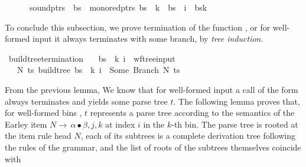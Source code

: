 \begin{isabellebody}
\ \ \ \ \ \ sound{\isacharunderscore}{\kern0pt}ptrs\ {\isasymomega}\ bs\ {\isasymand}\ mono{\isacharunderscore}{\kern0pt}red{\isacharunderscore}{\kern0pt}ptrs\ bs\ {\isasymand}\ k\ {\isacharless}{\kern0pt}\ {\isacharbar}{\kern0pt}bs{\isacharbar}{\kern0pt}\ {\isasymand}\ i\ {\isacharless}{\kern0pt}\ {\isacharbar}{\kern0pt}bs{\isacharbang}{\kern0pt}k{\isacharbar}{\kern0pt}\ {\isacharbraceright}{\kern0pt}{\isachardoublequoteclose}%
\begin{isamarkuptext}%
To conclude this subsection, we prove termination of the function , or for
well-formed input it always terminates with some branch, by \textit{tree induction}.%
\end{isamarkuptext}\isamarkuptrue%
\isamarkupfalse%
\ build{\isacharunderscore}{\kern0pt}tree{\isacharprime}{\kern0pt}{\isacharunderscore}{\kern0pt}termination{\isacharcolon}{\kern0pt}\isanewline
\ \ \ {\isachardoublequoteopen}{\isacharparenleft}{\kern0pt}bs{\isacharcomma}{\kern0pt}\ {\isasymomega}{\isacharcomma}{\kern0pt}\ k{\isacharcomma}{\kern0pt}\ i{\isacharparenright}{\kern0pt}\ {\isasymin}\ wf{\isacharunderscore}{\kern0pt}tree{\isacharunderscore}{\kern0pt}input{\isachardoublequoteclose}\isanewline
\ \ \ {\isachardoublequoteopen}{\isasymexists}N\ ts{\isachardot}{\kern0pt}\ build{\isacharunderscore}{\kern0pt}tree{\isacharprime}{\kern0pt}\ bs\ {\isasymomega}\ k\ i\ {\isacharequal}{\kern0pt}\ Some\ {\isacharparenleft}{\kern0pt}Branch\ N\ ts{\isacharparenright}{\kern0pt}{\isachardoublequoteclose}%
\isadelimproof
%
\endisadelimproof
%
\isatagproof
%
\endisatagproof
{\isafoldproof}%
%
\isadelimproof
%
\endisadelimproof
%
\isadelimdocument
%
\endisadelimdocument
%
\isatagdocument
%
\isamarkuptrue%
%
\endisatagdocument
{\isafolddocument}%
%
\isadelimdocument
%
\endisadelimdocument
%
\begin{isamarkuptext}%
From the previous lemma, We know that for well-formed input a call of the form  always terminates
and yields some parse tree $t$. The following lemma proves that, for well-formed bins ,
$t$ represents a parse tree according to the semantics of the Earley item $N \rightarrow \, \alpha \bullet \beta, j, k$
at index $i$ in the $k$-th bin. The parse tree is rooted at the item rule head $N$, each of its subtrees is a complete derivation
tree following the rules of the grammar, and the list of roots of the subtrees themselves coincide with

\end{isamarkuptext}
\end{isabellebody}
